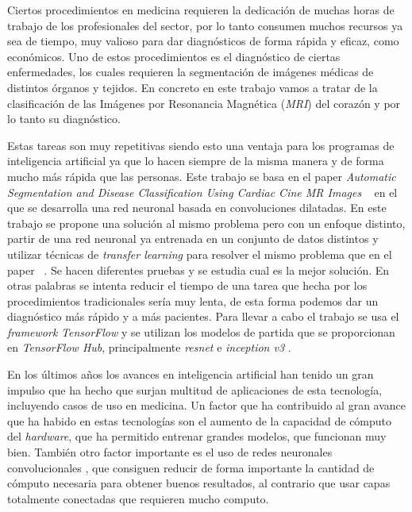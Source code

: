 \documentclass[12pt,a4paper]{article}
\begin{document}
Ciertos procedimientos en medicina requieren la dedicación de muchas horas de trabajo de los profesionales del sector, por lo tanto consumen muchos recursos ya sea de tiempo, muy valioso para dar diagnósticos de forma rápida y eficaz, como económicos. Uno de estos procedimientos es el diagnóstico de ciertas enfermedades, los cuales requieren la segmentación de imágenes médicas de distintos órganos y tejidos. En concreto en este trabajo vamos a tratar de la clasificación de las Imágenes por Resonancia Magnética (\textit{MRI}) del corazón y por lo tanto su diagnóstico.
\bigskip

Estas tareas son muy repetitivas siendo esto una ventaja para los programas de inteligencia artificial ya que lo hacen siempre de la misma manera y de forma mucho más rápida que las personas. Este trabajo se basa en el paper \textit{Automatic Segmentation and Disease Classification Using Cardiac Cine MR Images} ~\cite{DBLP:journals/corr/abs-1708-01141} en el que se desarrolla una red neuronal basada en convoluciones dilatadas. En este trabajo se propone una solución al mismo problema pero con un enfoque distinto, partir de una red neuronal ya entrenada en un conjunto de datos distintos y utilizar técnicas de \textit{transfer learning} para resolver el mismo problema que en el paper ~\cite{DBLP:journals/corr/abs-1708-01141}. Se hacen diferentes pruebas y se estudia cual es la mejor solución. En otras palabras se intenta reducir el tiempo de una tarea que hecha por los procedimientos tradicionales sería muy lenta, de esta forma podemos dar un diagnóstico más rápido y a más pacientes. Para llevar a cabo el trabajo se usa el \textit{framework} \textit{TensorFlow} y se utilizan los modelos de partida que se proporcionan en \textit{TensorFlow Hub}, principalmente \textit{resnet} e \textit{inception v3} \cite{DBLP:journals/corr/SzegedyVISW15}.
\bigskip

En los últimos años los avances en inteligencia artificial han tenido un gran impulso que ha hecho que surjan multitud de aplicaciones de esta tecnología, incluyendo casos de uso en medicina. Un factor que ha contribuido al gran avance que ha habido en estas tecnologías son el aumento de la capacidad de cómputo del \textit{hardware}, que ha permitido entrenar grandes modelos, que funcionan muy bien. También otro factor importante es el uso de redes neuronales convolucionales \cite{DBLP:journals/corr/SzegedyVISW15}, que consiguen reducir de forma importante la cantidad de cómputo necesaria para obtener buenos resultados, al contrario que usar capas totalmente conectadas que requieren mucho computo.
\bigskip
\end{document}
